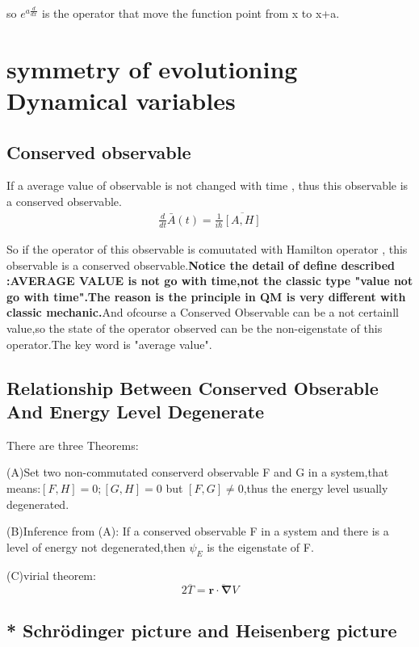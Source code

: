 \documentclass{article}
\begin{document}
  so $e^{a\frac{d}{dx}}$ is the operator that move the function point from x to x+a.

  \section{symmetry of evolutioning Dynamical variables }

  \subsection{Conserved observable}

  If a average value of observable is not changed with time , thus this observable is a conserved observable.
  \begin{align}
    \frac{d}{dt}\bar A(t)=\frac1{i\hbar}\overline{[A,H]}
  \end{align}

  So if the operator of this observable is comuutated with Hamilton operator , this observable is a conserved observable.\textbf{Notice the detail of define described :AVERAGE VALUE is not go with time,not the classic type "value not go with time".The reason is the principle in QM is very different with classic mechanic.}And ofcourse a Conserved Observable can be a not certainll value,so the state of the operator observed can be the non-eigenstate of this operator.The key word is "average value".

  \subsection{Relationship Between Conserved Obserable And Energy Level Degenerate}

  There are three Theorems:

  (A)Set two non-commutated conserverd observable F and G in a system,that means:$[F,H]=0;[G,H]=0$ but $[F,G]\ne0$,thus the energy level usually degenerated.

  (B)Inference from (A):
  If a conserved observable F in a system and there is a level of energy not degenerated,then $\psi_E$ is the eigenstate of F.

  (C)virial theorem:
  \begin{equation}
    2\overline{T} =\overline{\bm{r\cdot\nabla}V}
  \end{equation}

  \subsection{* Schr\"odinger picture and Heisenberg picture}
\end{document}
